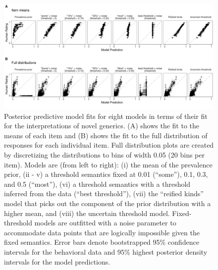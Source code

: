 \documentclass[floatsintext,doc]{apa6}
\begin{document}
\begin{figure}
\centering
\includegraphics{figs/genint-modelingResults-plotgrid-scatters.pdf}
\caption{\label{fig:genint-modelingResults}Posterior predictive model fits for eight models in terms of their fit for the interpretations of novel generics. (A) shows the fit to the means of each item and (B) shows the fit to the full distribution of responses for each individual item. Full distribution plots are created by discretizing the distributions to bins of width 0.05 (20 bins per item). Models are (from left to right): (i) the mean of the prevalence prior, (ii - v) a threshold semantics fixed at 0.01 (\enquote{some}), 0.1, 0.3, and 0.5 (``most''), (vi) a threshold semantics with a threshold inferred from the data (``best threshold''), (vii) the ``reified kinds'' model that picks out the component of the prior distribution with a higher mean, and (viii) the uncertain threshold model. Fixed-threshold models are outfitted with a noise parameter to accommodate data points that are logically impossible given the fixed semantics. Error bars denote bootstrapped 95\% confidence intervals for the behavioral data and 95\% highest posterior density intervals for the model predictions.}
\end{figure}
\end{document}
